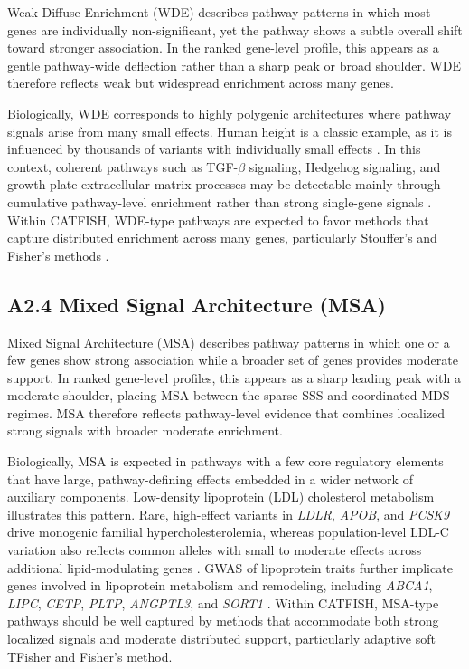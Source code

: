 \documentclass[unnumsec,webpdf,contemporary,large]{oup-authoring-template}%
\theoremstyle{thmstyleone}%
\theoremstyle{thmstyletwo}%
\theoremstyle{thmstylethree}%
\begin{document}
\begin{appendices}
Weak Diffuse Enrichment (WDE) describes pathway patterns in which most genes are individually non-significant, yet the pathway shows a subtle overall shift toward stronger association. In the ranked gene-level profile, this appears as a gentle pathway-wide deflection rather than a sharp peak or broad shoulder. WDE therefore reflects weak but widespread enrichment across many genes.

Biologically, WDE corresponds to highly polygenic architectures where pathway signals arise from many small effects. Human height is a classic example, as it is influenced by thousands of variants with individually small effects \citep{Guo2018HeightGWAS, Yengo2022HeightSaturation}. In this context, coherent pathways such as TGF-\(\beta\) signaling, Hedgehog signaling, and growth-plate extracellular matrix processes may be detectable mainly through cumulative pathway-level enrichment rather than strong single-gene signals \citep{LangoAllen2010Height, Guo2018HeightGWAS}. Within CATFISH, WDE-type pathways are expected to favor methods that capture distributed enrichment across many genes, particularly Stouffer's and Fisher's methods \citep{deLeeuw2015}.

\subsection{A2.4 Mixed Signal Architecture (MSA)}

Mixed Signal Architecture (MSA) describes pathway patterns in which one or a few genes show strong association while a broader set of genes provides moderate support. In ranked gene-level profiles, this appears as a sharp leading peak with a moderate shoulder, placing MSA between the sparse SSS and coordinated MDS regimes. MSA therefore reflects pathway-level evidence that combines localized strong signals with broader moderate enrichment.

Biologically, MSA is expected in pathways with a few core regulatory elements that have large, pathway-defining effects embedded in a wider network of auxiliary components. Low-density lipoprotein (LDL) cholesterol metabolism illustrates this pattern. Rare, high-effect variants in \textit{LDLR}, \textit{APOB}, and \textit{PCSK9} drive monogenic familial hypercholesterolemia, whereas population-level LDL-C variation also reflects common alleles with small to moderate effects across additional lipid-modulating genes \citep{Umlai2025LDLC, Peloso2022WGSbloodlipids}. GWAS of lipoprotein traits further implicate genes involved in lipoprotein metabolism and remodeling, including \textit{ABCA1}, \textit{LIPC}, \textit{CETP}, \textit{PLTP}, \textit{ANGPTL3}, and \textit{SORT1} \citep{Chasman2009LipoproteinProfiles}. Within CATFISH, MSA-type pathways should be well captured by methods that accommodate both strong localized signals and moderate distributed support, particularly adaptive soft TFisher and Fisher's method.


\end{appendices}
\end{document}
